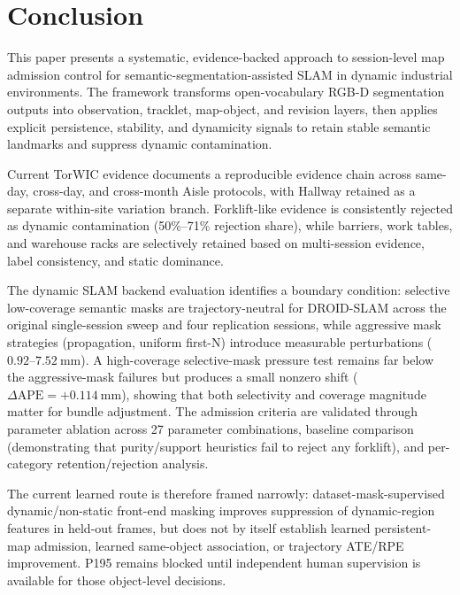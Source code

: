 \documentclass[journal]{IEEEtran}
\begin{document}
\section{Conclusion}
\label{sec:conclusion}

This paper presents a systematic, evidence-backed approach to session-level map admission control for semantic-segmentation-assisted SLAM in dynamic industrial environments. The framework transforms open-vocabulary RGB-D segmentation outputs into observation, tracklet, map-object, and revision layers, then applies explicit persistence, stability, and dynamicity signals to retain stable semantic landmarks and suppress dynamic contamination.

Current TorWIC evidence documents a reproducible evidence chain across same-day, cross-day, and cross-month Aisle protocols, with Hallway retained as a separate within-site variation branch. Forklift-like evidence is consistently rejected as dynamic contamination (50\%--71\% rejection share), while barriers, work tables, and warehouse racks are selectively retained based on multi-session evidence, label consistency, and static dominance.

The dynamic SLAM backend evaluation identifies a boundary condition: selective low-coverage semantic masks are trajectory-neutral for DROID-SLAM across the original single-session sweep and four replication sessions, while aggressive mask strategies (propagation, uniform first-N) introduce measurable perturbations ($0.92$--$7.52~\text{mm}$). A high-coverage selective-mask pressure test remains far below the aggressive-mask failures but produces a small nonzero shift ($\Delta\text{APE}=+0.114~\text{mm}$), showing that both selectivity and coverage magnitude matter for bundle adjustment. The admission criteria are validated through parameter ablation across 27 parameter combinations, baseline comparison (demonstrating that purity/support heuristics fail to reject any forklift), and per-category retention/rejection analysis.

The current learned route is therefore framed narrowly: dataset-mask-supervised dynamic/non-static front-end masking improves suppression of dynamic-region features in held-out frames, but does not by itself establish learned persistent-map admission, learned same-object association, or trajectory ATE/RPE improvement. P195 remains blocked until independent human supervision is available for those object-level decisions.
\end{document}
